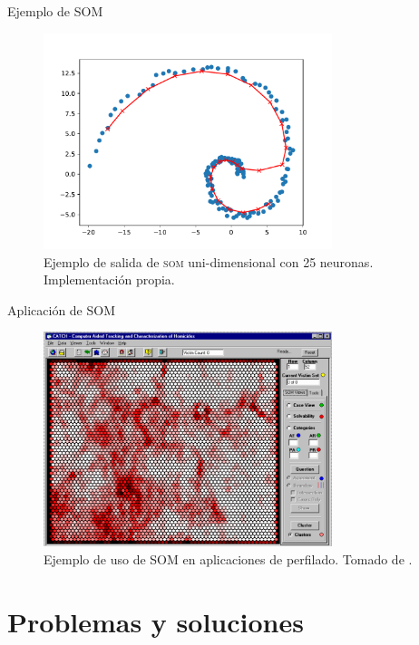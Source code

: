 \documentclass[10pt]{beamer}
\begin{document}
\begin{frame}{Ejemplo de \textsc{SOM}}
  \begin{figure}
    \centering
    \includegraphics[width=0.75\textwidth]{Images/som-implementation-example25.pdf}
    \caption[Ejemplo de salida de \textsc{som} uni-dimensional]{Ejemplo de salida de \textsc{som} uni-dimensional con 25 neuronas. Implementación propia.}
    \label{fig:som-impl-example}
  \end{figure}
\end{frame}

\begin{frame}{Aplicación de \textsc{SOM}}
  \begin{figure}
    \centering
    \includegraphics[width=0.75\textwidth]{Images/som-example.png}
    \caption[Ejemplo de uso de \textsc{SOM} en aplicaciones de perfilado]{Ejemplo de uso de \textsc{SOM} en aplicaciones de perfilado. Tomado de \cite{mena2003investigative}.}
    \label{fig:som-example}
  \end{figure}
\end{frame}

\section{Problemas y soluciones}
\end{document}
